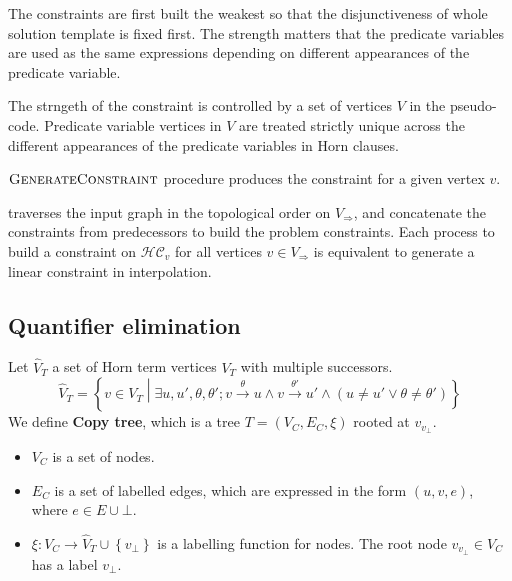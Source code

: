 \documentclass[a4paper,12pt]{article}
\newcommand{\edgel}[3]{#1\xrightarrow{#2}#3}
\begin{document}
The constraints are first built the weakest so that the disjunctiveness of
whole solution template is fixed first.  The strength matters that the
predicate variables are used as the same expressions depending on
different appearances of the predicate variable.

The strngeth of the constraint is controlled by a set of vertices $V$
in the pseudo-code.  Predicate variable vertices in $V$ are treated
strictly unique across the different appearances of the predicate
variables in Horn clauses.



$\mbox{\sc GenerateConstraint}$ procedure produces the constraint for a given vertex $v$.


\begin{algorithm}
\caption{$ \genConstr (G, v, visited) $}\label{alg:genConstr}
\begin{algorithmic}
    \ELSE
    \ENDIF
  \ENDFOR
\ENDFOR
\end{algorithmic}
\end{algorithm}





traverses the input graph in the topological order on
$V_\Rightarrow$, and concatenate the constraints from predecessors to
build the problem constraints.  Each process to build a constraint on
$\mathcal{HC}_v$ for all vertices $v \in V_\Rightarrow$ is equivalent
to generate a linear constraint in interpolation.

\subsection{Quantifier elimination}

Let $\hat V_T$ a set of Horn term vertices $V_T$ with multiple
successors.
\[ \hat V_T = \left\lbrace v \in V_T \middle|
\exists u, u', \theta, \theta';
\edgel{v}{\theta}{u} \wedge \edgel{v}{\theta'}{u'} \wedge
(u \ne u' \vee \theta \ne \theta') \right\rbrace \]
We define \textbf{Copy tree}, which is a tree $T=(V_C,E_C,\xi)$
rooted at $v_{v_\bot}$.
\begin{itemize}
\item $V_C$ is a set of nodes.
\item $E_C$ is a set of labelled edges, which are expressed in the
  form $(u,v,e)$, where $e \in E \cup {\bot}$.
\item $\xi: V_C \rightarrow \hat V_T \cup \left\lbrace v_\bot
  \right\rbrace$ is a labelling function for nodes. The root node
  $v_{v_\bot} \in V_C$ has a label $v_\bot$.
\end{itemize}
\end{document}
